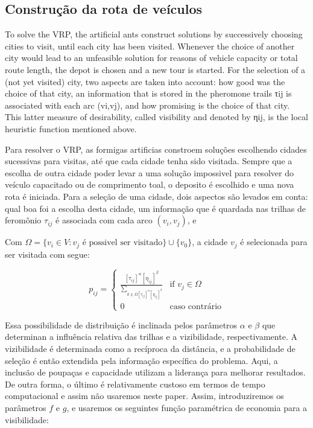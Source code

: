 \documentclass[a4paper, 12pt]{article}
\begin{document}
\subsection{Construção da rota de veículos}

To solve the VRP, the artificial ants construct solutions by successively choosing cities to visit,
until each city has been visited. Whenever the choice of another city would lead to an unfeasible
solution for reasons of vehicle capacity or total route length, the depot is chosen and a new tour
is started. For the selection of a (not yet visited) city, two aspects are taken into account: how
good was the choice of that city, an information that is stored in the pheromone trails τij is
associated with each arc (vi,vj), and how promising is the choice of that city. This latter measure
of desirability, called visibility and denoted by ηij, is the local heuristic function mentioned
above.

 Para resolver o VRP, as formigas artificias constroem soluções escolhendo cidades sucessivas para
visitas, até que cada cidade tenha sido visitada. Sempre que a escolha de outra cidade poder levar a
uma solução impossivel para resolver do veículo capacitado ou de comprimento toal, o deposito é
escolhido e uma nova rota é iniciada. Para a seleção de uma cidade, dois aspectos são levados em
conta: qual boa foi a escolha desta cidade, um informação que é quardada nas trilhas de feromônio
$\tau_{ij}$ é associada com cada arco $(v_i, v_j)$, e 




 Com $\Omega = \{ v_i \in V: v_j\textrm{ é possivel ser visitado} \} \cup \{v_0\}$, a cidade $v_j$ é
selecionada para ser visitada com segue:

\[p_{ij} = \left\{
\begin{array}{ll}
\frac{[\tau_{ij}]^\alpha[\eta_{ij}]^\beta}{\sum_{k\in\Omega[\tau_{ij}]^\alpha[\eta_{ij}]^\beta}}
& \textrm{if } v_j \in \Omega\\
0 & \textrm{caso contrário}
\end{array}\right.\]

 Essa possibilidade de distribuição é inclinada pelos parâmetros $\alpha$ e $\beta$ que determinan a
influência relativa das trilhas e a vizibilidade, respectivamente. A vizibilidade é determinada como
a recíproca da distância, e a probabilidade de seleção é então extendida pela informação específica
do problema. Aqui, a inclusão de poupaças e capacidade utilizam a liderança para melhorar
resultados. De outra forma, o último é relativamente custoso em termos de tempo computacional e
assim não usaremos neste paper. Assim, introduziremos os parâmetros $f$ e $g$, e usaremos os
seguintes função paramétrica de economia para a visibilidade:
\end{document}

